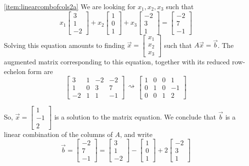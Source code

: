 \documentclass{ximera}
\begin{document}
\begin{example}
\begin{explanation} \ref{item:linearcombofcols2a}
 We are looking for $x_1, x_2, x_3$ such that
$$x_1\begin{bmatrix}3\\1\\-2\end{bmatrix}+x_2\begin{bmatrix}1\\0\\1\end{bmatrix}+x_3\begin{bmatrix}-2\\3\\1\end{bmatrix}=\begin{bmatrix}-2\\7\\-1\end{bmatrix}$$
Solving this equation amounts to finding $\vec{x}=\begin{bmatrix}x_1\\x_2\\x_3\end{bmatrix}$ such that $A\vec{x}=\vec{b}$.  The augmented matrix corresponding to this equation, together with its reduced row-echelon form are
$$\left[\begin{array}{ccc|c}  
 3&1&-2&-2\\1&0&3&7\\-2&1&1&-1
 \end{array}\right]\begin{array}{c}
 \\
 \rightsquigarrow\\
 \\
 \end{array}\left[\begin{array}{ccc|c}  
 1&0&0&1\\0&1&0&-1\\0&0&1&2
 \end{array}\right]$$

So, $\vec{x}=\begin{bmatrix} 1\\-1\\2\end{bmatrix}$ is a solution to the matrix equation.  We conclude that $\vec{b}$ is a linear combination of the columns of $A$, and write
$$\vec{b}=\begin{bmatrix} -2\\7\\-1\end{bmatrix}=\begin{bmatrix} 3\\1\\-2\end{bmatrix}-\begin{bmatrix} 1\\0\\1\end{bmatrix}+2\begin{bmatrix} -2\\3\\1\end{bmatrix}$$


\end{explanation}
\end{example}
\end{document}
